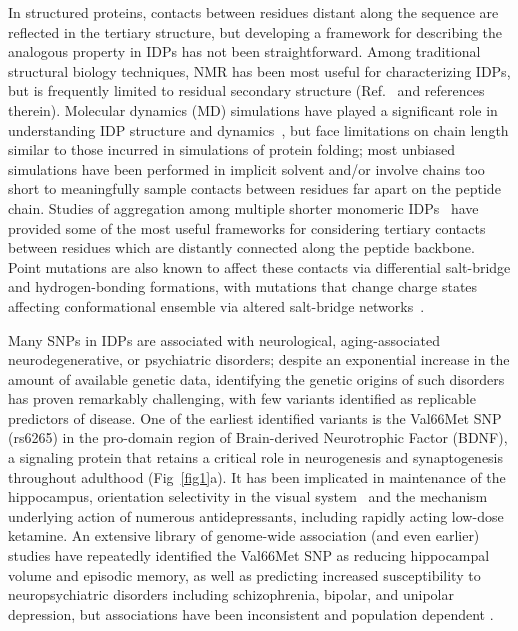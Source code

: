 \documentclass[10pt,letterpaper]{article}
\begin{document}
In structured proteins, contacts between residues distant along the sequence are reflected in the tertiary structure, but developing a framework for describing the analogous property in IDPs has not been straightforward. Among traditional structural biology techniques, NMR has been most useful for characterizing IDPs, but is frequently limited to residual secondary structure (Ref.~\cite{Mittag2007,Habchi2014} and references therein). Molecular dynamics (MD) simulations have played a significant role in understanding IDP structure and dynamics~\cite{Stanley2015,Ithuralde2016,Knott2012b,Invernizzi2013,Abeln2008,Yedvabny2015,Levine2017a}, but face limitations on chain length similar to those incurred in simulations of protein folding; most unbiased simulations have been performed in implicit solvent and/or involve chains too short to meaningfully sample contacts between residues far apart on the peptide chain. Studies of aggregation among multiple shorter monomeric IDPs~\cite{Levine2015,Pappu2008} have provided some of the most useful frameworks for considering tertiary contacts between residues which are distantly connected along the peptide backbone. Point mutations are also known to affect these contacts via differential salt-bridge and hydrogen-bonding formations, with mutations that change charge states affecting conformational ensemble via altered salt-bridge networks~\cite{Levine2015}. 

Many SNPs in IDPs are associated with neurological, aging-associated neurodegenerative, or psychiatric disorders; despite an exponential increase in the amount of available genetic data, identifying the genetic origins of such disorders has proven remarkably challenging, with few variants identified as replicable predictors of disease. One of the earliest identified variants is the Val66Met SNP (rs6265) in the pro-domain region of Brain-derived Neurotrophic Factor (BDNF)\cite{Notaras2015}, a signaling protein that retains a critical role in neurogenesis and synaptogenesis throughout adulthood\cite{Korte1995, Davies2003} (Fig~\ref{fig1}a). It has been implicated in maintenance of the hippocampus, orientation selectivity in the visual system~\cite{Huang1999, Liu2011,Gao2014} and the mechanism underlying action of numerous antidepressants\cite{Autry2012,Bjorkholm2016}, including rapidly acting low-dose ketamine\cite{Autry2011}. An extensive library of genome-wide association (and even earlier) studies have repeatedly identified the Val66Met SNP as reducing hippocampal volume and episodic memory, as well as predicting increased susceptibility to neuropsychiatric disorders including schizophrenia, bipolar, and unipolar depression, but associations have been inconsistent and population dependent \cite{soliman2010,Chen2008,Verhagen2010,Notaras2015, Autry2011}.
\end{document}
